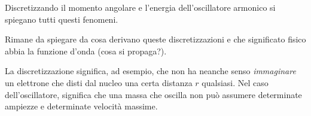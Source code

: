 Discretizzando il momento angolare e l'energia dell'oscillatore armonico si spiegano tutti questi fenomeni.

Rimane da spiegare da cosa derivano queste discretizzazioni e che significato fisico abbia la funzione d'onda (cosa si propaga?).

La discretizzazione significa, ad esempio, che non ha neanche senso \textit{immaginare} un elettrone che disti dal nucleo una certa distanza $r$ qualsiasi.
Nel caso dell'oscillatore, significa che una massa che oscilla non può assumere determinate ampiezze e determinate velocità massime.
